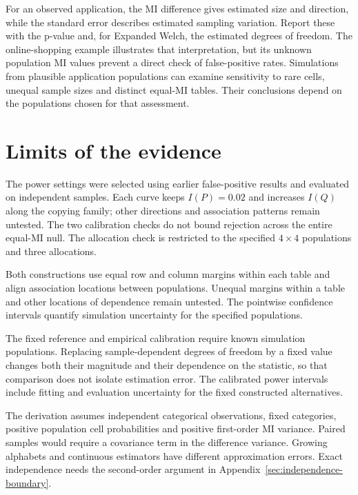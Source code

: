 For an observed application, the MI difference gives estimated size and
direction, while the standard error describes estimated sampling
variation. Report these with the p-value and, for Expanded Welch, the
estimated degrees of freedom. The online-shopping example illustrates
that interpretation, but its unknown population MI values prevent a
direct check of false-positive rates. Simulations from plausible
application populations can examine sensitivity to rare cells, unequal
sample sizes and distinct equal-MI tables. Their conclusions depend on
the populations chosen for that assessment.

\section{Limits of the evidence}

The power settings were selected using earlier false-positive results
and evaluated on independent samples. Each curve keeps \(I(P)=0.02\)
and increases \(I(Q)\) along the copying family; other directions and
association patterns remain untested. The two calibration checks do not
bound rejection across the entire equal-MI null. The allocation check
is restricted to the specified \(4\times4\) populations and three
allocations.

Both constructions use equal row and column margins within each table
and align association locations between populations. Unequal margins
within a table and other locations of dependence remain untested.
The pointwise confidence intervals quantify simulation uncertainty for
the specified populations.

The fixed reference and empirical calibration require known simulation
populations. Replacing sample-dependent degrees of freedom by a fixed
value changes both their magnitude and their dependence on the statistic,
so that comparison does not isolate estimation error. The calibrated
power intervals include fitting and evaluation uncertainty for the fixed
constructed alternatives.

The derivation assumes independent categorical observations, fixed
categories, positive population cell probabilities and positive
first-order MI variance. Paired samples would require a covariance term
in the difference variance. Growing alphabets and continuous estimators
have different approximation errors. Exact independence needs the
second-order argument in Appendix~\ref{sec:independence-boundary}.
